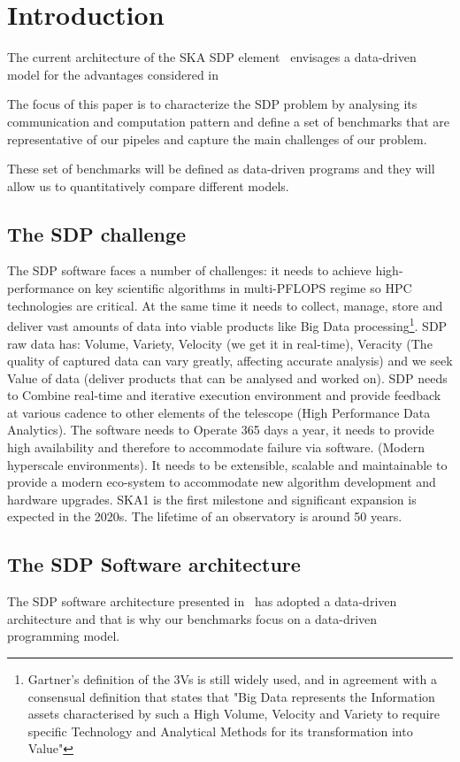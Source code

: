 \section{Introduction}

The current architecture of the SKA SDP element~\cite{SDParch} envisages a 
data-driven model for the advantages considered in~\cite{DDchoice}

The focus of this paper is to characterize the SDP problem by analysing its
communication and computation pattern and define a set of benchmarks that
are representative of our pipeles and capture the main challenges of our problem.

These set of benchmarks will be defined as data-driven programs and they will
allow us to quantitatively compare different models. 

\subsection{The SDP challenge}
The SDP software faces a number of challenges: it needs to achieve high-performance on key scientific algorithms in multi-PFLOPS regime so HPC technologies are critical. At the same time it needs to collect, manage, store and deliver vast amounts of data into viable products like Big Data processing\footnote{Gartner's definition of the 3Vs is still widely used, and in agreement with a consensual definition that states that "Big Data represents the Information assets characterised by such a High Volume, Velocity and Variety to require specific Technology and Analytical Methods for its transformation into Value"}. SDP raw data has: Volume, Variety, Velocity (we get it in real-time), Veracity (The quality of captured data can vary greatly, affecting accurate analysis) and we seek Value of data (deliver products that can be analysed and worked on). 
SDP needs to Combine real-time and iterative execution environment and provide feedback at various cadence to other elements of the telescope (High Performance Data Analytics). The software needs to Operate 365 days a year, it needs to provide high availability and therefore to accommodate failure via software. (Modern hyperscale environments).
It needs to be extensible, scalable and maintainable to provide a modern eco-system to accommodate new algorithm development and hardware upgrades.
SKA1 is the first milestone and significant expansion is expected in the 2020s. The lifetime of an observatory is around 50 years. 

\subsection{The SDP Software architecture}
The SDP software architecture presented in~\cite{SDParch} has adopted a data-driven architecture and that is why our benchmarks focus on a
data-driven programming model. 

